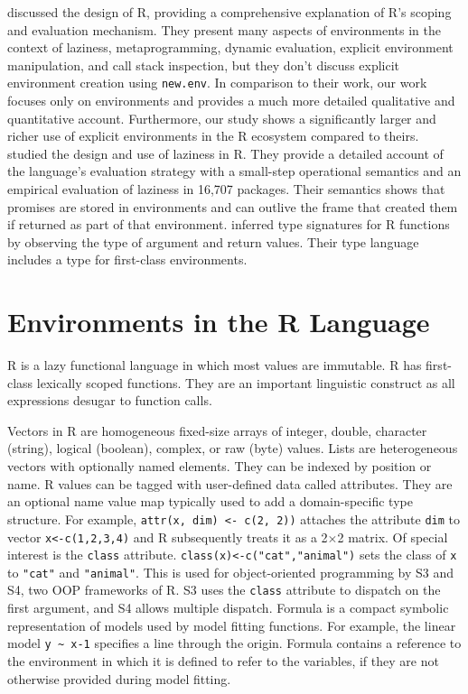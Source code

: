 \documentclass[10pt,review,sigplan,anonymous=true,authorversion=true,nonacm=true]{acmart}
\newcommand{\code}[1]{\lstinline |#1|\xspace}
\begin{document}
\citet{ecoop12} discussed the design of R, providing a comprehensive explanation
of R's scoping and evaluation mechanism. They present many aspects of
environments in the context of laziness, metaprogramming, dynamic evaluation,
explicit environment manipulation, and call stack inspection, but they don't
discuss explicit environment creation using \code{new.env}. In comparison to
their work, our work focuses only on environments and provides a much more
detailed qualitative and quantitative account. Furthermore, our study shows a
significantly larger and richer use of explicit environments in the R ecosystem
compared to theirs. \citet{oopsla19b} studied the design and use of laziness in
R. They provide a detailed account of the language’s evaluation strategy with a
small-step operational semantics and an empirical evaluation of laziness in
16,707 packages. Their semantics shows that promises are stored in environments
and can outlive the frame that created them if returned as part of that
environment. \citet{oopsla20b} inferred type signatures for R functions by
observing the type of argument and return values. Their type language includes a
type for first-class environments.


\section{Environments in the R Language}


R is a lazy functional language in which most values are immutable. R has
first-class lexically scoped functions. They are an important linguistic
construct as all expressions desugar to function calls.

Vectors in R are homogeneous fixed-size arrays of integer, double, character
(string), logical (boolean), complex, or raw (byte) values. Lists are
heterogeneous vectors with optionally named elements. They can be indexed by
position or name. R values can be tagged with user-defined data called
attributes. They are an optional name value map typically used to add a
domain-specific type structure. For example, \code{attr(x, dim) <- c(2, 2))}
attaches the attribute \code{dim} to vector \code{x<-c(1,2,3,4)} and R
subsequently treats it as a 2$\times$2 matrix. Of special interest is the
\code{class} attribute. \code{class(x)<-c("cat","animal")} sets the class of
\code{x} to \code{"cat"} and \code{"animal"}. This is used for object-oriented
programming by S3 and S4, two OOP frameworks of R. S3 uses the \code{class}
attribute to dispatch on the first argument, and S4 allows multiple dispatch.
Formula is a compact symbolic representation of models used by model fitting
functions. For example, the linear model \code{y ~ x-1} specifies a line through
the origin. Formula contains a reference to the environment in which it is
defined to refer to the variables, if they are not otherwise provided during
model fitting.
\end{document}
